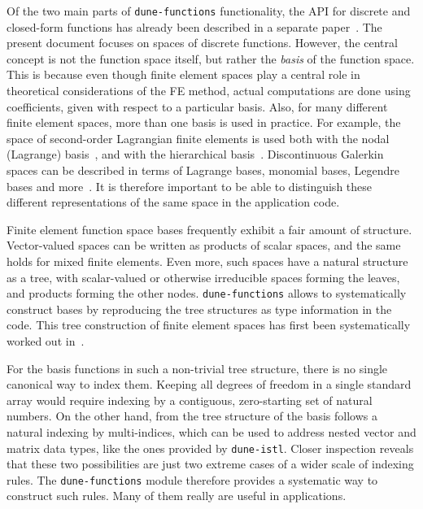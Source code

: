 \documentclass[a4paper,10pt,headings=normal,bibliography=totoc]{scrartcl}
\newcommand{\dunemodule}[1]{\texttt{#1}}
\begin{document}
Of the two main parts of \dunemodule{dune-functions} functionality, the API for discrete and
closed-form functions has already been described in a separate paper~\cite{engwer_graeser_muething_sander:2015}.
The present document focuses on spaces of discrete functions.  However,
the central concept is not the function space itself, but rather the {\em basis} of the function space.
This is because even though finite element spaces play a central role in theoretical considerations of the FE method,
actual computations are done using coefficients, given with respect to a particular basis.  Also,
for many different finite element spaces, more than one basis is used in practice.  For example,
the space of second-order Lagrangian finite elements is used both with the nodal (Lagrange) basis~\cite{braess:2013},
and with the
hierarchical basis~\cite{bank:1996}.  Discontinuous Galerkin spaces can be described in terms of Lagrange bases,
monomial bases, Legendre bases and more~\cite{hesthaven_warburton:2008}.
It is therefore important to be able to distinguish these different
representations of the same space in the application code.

Finite element function space bases frequently exhibit a fair amount of structure.  Vector-valued spaces can be
written as products of scalar spaces, and the same holds for mixed finite elements.  Even more, such spaces
have a natural structure as a tree, with scalar-valued or otherwise irreducible spaces forming the leaves, and
products forming the other nodes.
\dunemodule{dune-functions} allows to systematically construct bases by reproducing the tree structures
as type information in the code.
This tree construction of finite element spaces has first been systematically worked out in~\cite{muething:2015}.

For the basis functions in such a non-trivial tree structure, there is no single canonical way
to index them.  Keeping all degrees of freedom in a single standard array would require indexing
by a contiguous, zero-starting set of natural numbers. On the other hand, from the tree structure
of the basis follows a natural indexing by multi-indices, which can be used to address nested
vector and matrix data types, like the ones provided by \dunemodule{dune-istl}. Closer inspection
reveals that these two possibilities are just two extreme cases of a wider scale of indexing rules.
The \dunemodule{dune-functions} module therefore provides a systematic way to construct such
rules.  Many of them really are useful in applications.
\end{document}
